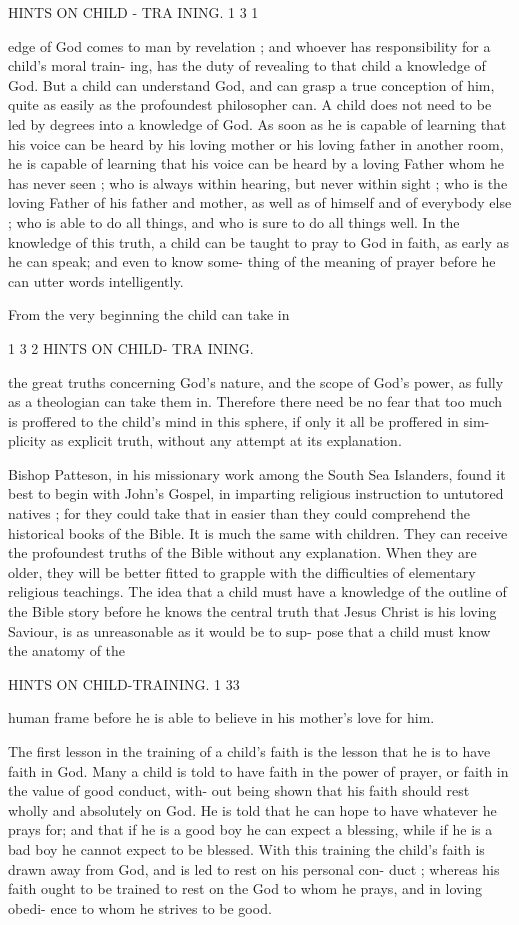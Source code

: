 \documentclass[
]{book}
\begin{document}
HINTS ON CHILD - TRA INING. 1 3 1

edge of God comes to man by revelation ; and whoever has responsibility for a child's moral train- ing, has the duty of revealing to that child a knowledge of God. But a child can understand God, and can grasp a true conception of him, quite as easily as the profoundest philosopher can. A child does not need to be led by degrees into a knowledge of God. As soon as he is capable of learning that his voice can be heard by his loving mother or his loving father in another room, he is capable of learning that his voice can be heard by a loving Father whom he has never seen ; who is always within hearing, but never within sight ; who is the loving Father of his father and mother, as well as of himself and of everybody else ; who is able to do all things, and who is sure to do all things well. In the knowledge of this truth, a child can be taught to pray to God in faith, as early as he can speak; and even to know some- thing of the meaning of prayer before he can utter words intelligently.

From the very beginning the child can take in

1 3 2 HINTS ON CHILD- TRA INING.

the great truths concerning God's nature, and the scope of God's power, as fully as a theologian can take them in. Therefore there need be no fear that too much is proffered to the child's mind in this sphere, if only it all be proffered in sim- plicity as explicit truth, without any attempt at its explanation.

Bishop Patteson, in his missionary work among the South Sea Islanders, found it best to begin with John's Gospel, in imparting religious instruction to untutored natives ; for they could take that in easier than they could comprehend the historical books of the Bible. It is much the same with children. They can receive the profoundest truths of the Bible without any explanation. When they are older, they will be better fitted to grapple with the difficulties of elementary religious teachings. The idea that a child must have a knowledge of the outline of the Bible story before he knows the central truth that Jesus Christ is his loving Saviour, is as unreasonable as it would be to sup- pose that a child must know the anatomy of the

HINTS ON CHILD-TRAINING. 1 33

human frame before he is able to believe in his mother's love for him.

The first lesson in the training of a child's faith is the lesson that he is to have faith in God. Many a child is told to have faith in the power of prayer, or faith in the value of good conduct, with- out being shown that his faith should rest wholly and absolutely on God. He is told that he can hope to have whatever he prays for; and that if he is a good boy he can expect a blessing, while if he is a bad boy he cannot expect to be blessed. With this training the child's faith is drawn away from God, and is led to rest on his personal con- duct ; whereas his faith ought to be trained to rest on the God to whom he prays, and in loving obedi- ence to whom he strives to be good.
\end{document}
